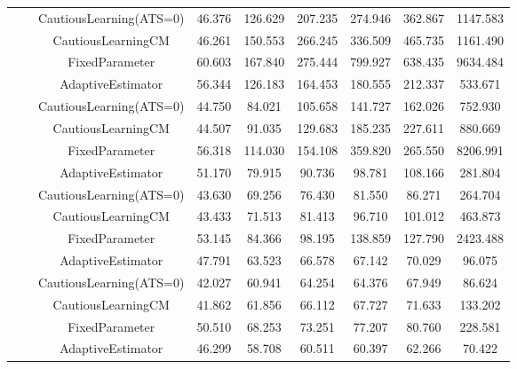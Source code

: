 \begin{table}[!h]
\begin{tabular}[t]{ccccccccc}
 &  & CautiousLearning(ATS=0) & 46.376 & 126.629 & 207.235 & 274.946 & 362.867 & 1147.583\\

 &  & CautiousLearningCM & 46.261 & 150.553 & 266.245 & 336.509 & 465.735 & 1161.490\\

 & \multirow[t]{-4}{*}{\centering\arraybackslash 0.25} & FixedParameter & 60.603 & 167.840 & 275.444 & 799.927 & 638.435 & 9634.484\\
\cmidrule{2-9}
 &  & AdaptiveEstimator & 56.344 & 126.183 & 164.453 & 180.555 & 212.337 & 533.671\\

 &  & CautiousLearning(ATS=0) & 44.750 & 84.021 & 105.658 & 141.727 & 162.026 & 752.930\\

 &  & CautiousLearningCM & 44.507 & 91.035 & 129.683 & 185.235 & 227.611 & 880.669\\

 & \multirow[t]{-4}{*}{\centering\arraybackslash 0.35} & FixedParameter & 56.318 & 114.030 & 154.108 & 359.820 & 265.550 & 8206.991\\
\cmidrule{2-9}
 &  & AdaptiveEstimator & 51.170 & 79.915 & 90.736 & 98.781 & 108.166 & 281.804\\

 &  & CautiousLearning(ATS=0) & 43.630 & 69.256 & 76.430 & 81.550 & 86.271 & 264.704\\

 &  & CautiousLearningCM & 43.433 & 71.513 & 81.413 & 96.710 & 101.012 & 463.873\\

 & \multirow[t]{-4}{*}{\centering\arraybackslash 0.50} & FixedParameter & 53.145 & 84.366 & 98.195 & 138.859 & 127.790 & 2423.488\\
\cmidrule{2-9}
 &  & AdaptiveEstimator & 47.791 & 63.523 & 66.578 & 67.142 & 70.029 & 96.075\\

 &  & CautiousLearning(ATS=0) & 42.027 & 60.941 & 64.254 & 64.376 & 67.949 & 86.624\\

 &  & CautiousLearningCM & 41.862 & 61.856 & 66.112 & 67.727 & 71.633 & 133.202\\

 & \multirow[t]{-4}{*}{\centering\arraybackslash 0.75} & FixedParameter & 50.510 & 68.253 & 73.251 & 77.207 & 80.760 & 228.581\\
\cmidrule{2-9}
 &  & AdaptiveEstimator & 46.299 & 58.708 & 60.511 & 60.397 & 62.266 & 70.422\\


\end{tabular}
\end{table}
